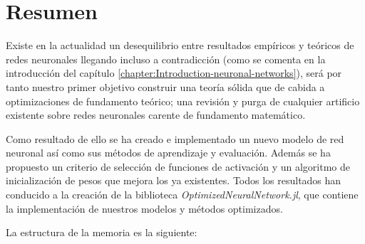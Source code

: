%


\chapter*{Resumen}\label{ch:resumen}

Existe en la actualidad un desequilibrio entre resultados empíricos 
y teóricos de redes neuronales llegando incluso a contradicción
 (como se comenta en la introducción del capítulo 
 \ref{chapter:Introduction-neuronal-networks}), será por tanto
nuestro primer objetivo construir una teoría sólida
que de cabida a 
 optimizaciones de fundamento teórico; 
una revisión y
 purga de cualquier artificio existente sobre 
 redes neuronales carente de fundamento matemático. 

Como resultado de ello se ha creado e implementado 
un nuevo modelo de red neuronal así como sus 
métodos de aprendizaje y evaluación. 
Además se ha propuesto un criterio de selección de 
funciones de activación y un algoritmo de 
inicialización de pesos que mejora los ya existentes. Todos los resultados han conducido a la creación de 
la biblioteca \textit{OptimizedNeuralNetwork.jl}, que contiene la implementación de nuestros modelos y métodos optimizados. 


La estructura de la memoria es la siguiente: 

